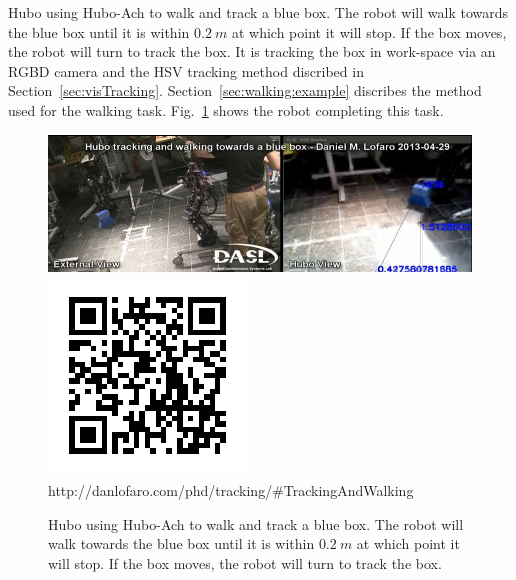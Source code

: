 Hubo using Hubo-Ach to walk and track a blue box.  
The robot will walk towards the blue box until it is within $0.2~m$ at which point it will stop.  
If the box moves, the robot will turn to track the box.
It is tracking the box in work-space via an RGBD camera and the HSV tracking method discribed in Section~\ref{sec:visTracking}.
Section~\ref{sec:walking:example} discribes the method used for the walking task.
Fig.~\ref{fig:visualSeroving} shows the robot completing this task.

\begin{figure}[thpb]
  \centering
\includegraphics[width=0.6\columnwidth]{./pix/servoing.png}
\includegraphics[width=0.3\columnwidth]{./qrcode/qrcode-visualServoing.png}\\
     http://danlofaro.com/phd/tracking/\#TrackingAndWalking
  \caption{Hubo using Hubo-Ach to walk and track a blue box.  The robot will walk towards the blue box until it is within $0.2~m$ at which point it will stop.  If the box moves, the robot will turn to track the box.}
  \label{fig:visualSeroving}
\end{figure}

